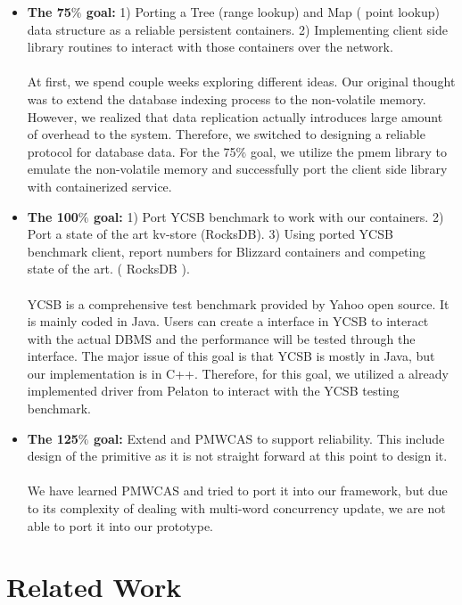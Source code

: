 \begin{itemize}
    \item {\bf The 75$\%$ goal:} 1) Porting a Tree (range lookup) and Map ( point lookup) data structure as a reliable persistent containers. 2) Implementing client side library routines to interact with those containers over the network. 
    \\ \\
    At first, we spend couple weeks exploring different ideas. Our original thought was to extend the database indexing process to the non-volatile memory. However, we realized that data replication actually introduces large amount of overhead to the system. Therefore, we switched to designing a reliable protocol for database data. For the 75$\%$ goal, we utilize the pmem library to emulate the non-volatile memory and successfully port the client side library with containerized service.
    \\
    \item {\bf The 100$\%$ goal:} 1) Port YCSB benchmark to work with our containers. 2) Port a state of the art kv-store (RocksDB). 3) Using ported YCSB benchmark client, report numbers for Blizzard containers and competing state of the art. ( RocksDB ).
    \\ \\
    YCSB is a comprehensive test benchmark provided by Yahoo open source. It is mainly coded in Java. Users can create a interface in YCSB to interact with the actual DBMS and the performance will be tested through the interface. The major issue of this goal is that YCSB is mostly in Java, but our implementation is in C++. Therefore, for this goal, we utilized a already implemented driver from Pelaton to interact with the YCSB testing benchmark. 
    \\
    \item {\bf The 125$\%$ goal:} Extend and PMWCAS to support reliability. This include design of the primitive as it is not straight forward at this point to design it.
    \\ \\
    We have learned PMWCAS and tried to port it into our framework, but due to its complexity of dealing with multi-word concurrency update, we are not able to port it into our prototype. 
\end{itemize}



\section{Related Work}

